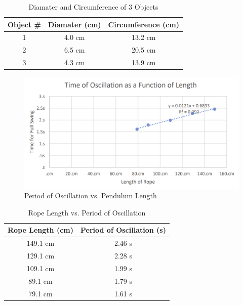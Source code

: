 \documentclass{article}
\begin{document}
\setlength{\tabcolsep}{18pt}
\renewcommand{\arraystretch}{1.5}
\begin{table}[H]
\centering
\begin{tabular}{|c|c|c|}
    \hline
    \rowcolor{black}
    \color{white} Object \# & \color{white} Diamater (cm) & \color{white} Circumference (cm) \\
    \hline
    1 & 4.0 cm & 13.2 cm \\
    \hline
    2 & 6.5 cm & 20.5 cm \\
    \hline
    3 & 4.3 cm & 13.9 cm \\
    
    \hline
\end{tabular} 
\caption{Diamater and Circumference of 3 Objects}
\end{table}

\begin{figure}[H]
    \includegraphics*[width=16cm]{lab1_plot3.png}
    \caption{Period of Oscillation vs. Pendulum Length}
    \label{plot:2}
\end{figure}

\begin{table}[H]
\centering
\begin{tabular}{|c|c|}
    \hline
    \rowcolor{black}
    \color{white} Rope Length (cm) & \color{white} Period of Oscillation (s) \\
    \hline
    149.1 cm & 2.46 s \\
    \hline
    129.1 cm & 2.28 s \\
    \hline
    109.1 cm & 1.99 s \\
    \hline
    89.1 cm  & 1.79 s \\
    \hline
    79.1 cm  & 1.61 s \\

    \hline
\end{tabular} 
\caption{Rope Length vs. Period of Oscillation}
\end{table}
\end{document}
